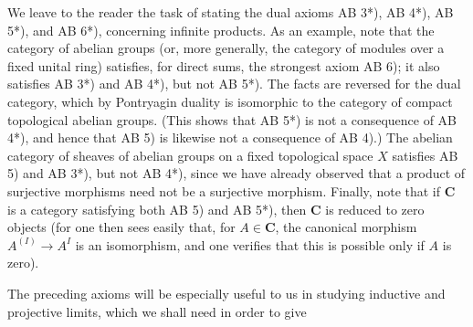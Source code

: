 We leave to the reader the task of stating the dual axioms AB 3*), AB 4*),
AB 5*), and AB 6*), concerning infinite products. As an example, note that the
category of abelian groups (or, more generally, the category of modules over a
fixed unital ring) satisfies, for direct sums, the strongest axiom AB 6); it
also satisfies AB 3*) and AB 4*), but not AB 5*). The facts are reversed for
the dual category, which by Pontryagin duality is isomorphic to the category of
compact topological abelian groups. (This shows that AB 5*) is not a
consequence of AB 4*), and hence that AB 5) is likewise not a consequence of
AB 4).) The abelian category of sheaves of abelian groups on a fixed
topological space $X$ satisfies AB 5) and AB 3*), but not AB 4*), since we have
already observed that a product of surjective morphisms need not be a
surjective morphism. Finally, note that if $\mathbf{C}$ is a category satisfying both
AB 5) and AB 5*), then $\mathbf{C}$ is reduced to zero objects (for one then sees easily
that, for $A\in\mathbf{C}$, the canonical morphism
$A^{(I)}\to A^I$ is an isomorphism, and one verifies that this is
possible only if $A$ is zero).

The preceding axioms will be especially useful to us in studying inductive and
projective limits, which we shall need in order to give

